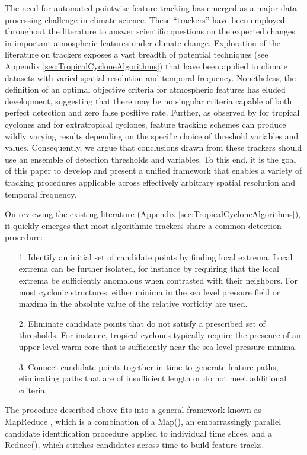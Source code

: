 \documentclass[gmdd, hvmath, online]{copernicus_discussions}
\begin{document}
The need for automated pointwise feature tracking has emerged as a major data processing challenge in climate science.  These ``trackers'' have been employed throughout the literature to answer scientific questions on the expected changes in important atmospheric features under climate change.  Exploration of the literature on trackers exposes a vast breadth of potential techniques (see Appendix \ref{sec:TropicalCycloneAlgorithms}) that have been applied to climate datasets with varied spatial resolution and temporal frequency.  Nonetheless, the definition of an optimal objective criteria for atmospheric features has eluded development, suggesting that there may be no singular criteria capable of both perfect detection and zero false positive rate.  Further, as observed by \cite{walsh2007objectively} for tropical cyclones and \cite{neu2013imilast} for extratropical cyclones, feature tracking schemes can produce wildly varying results depending on the specific choice of threshold variables and values.  Consequently, we argue that conclusions drawn from these trackers should use an ensemble of detection thresholds and variables.  To this end, it is the goal of this paper to develop and present a unified framework that enables a variety of tracking procedures applicable across effectively arbitrary spatial resolution and temporal frequency.

On reviewing the existing literature (Appendix \ref{sec:TropicalCycloneAlgorithms}), it quickly emerges that most algorithmic trackers share a common detection procedure:
\begin{itemize}
\item[1.] Identify an initial set of candidate points by finding local extrema.  Local extrema can be further isolated, for instance by requiring that the local extrema be sufficiently anomalous when contrasted with their neighbors.  For most cyclonic structures, either minima in the sea level pressure field or maxima in the absolute value of the relative vorticity are used.
\item[2.] Eliminate candidate points that do not satisfy a prescribed set of thresholds.  For instance, tropical cyclones typically require the presence of an upper-level warm core that is sufficiently near the sea level pressure minima.
\item[3.] Connect candidate points together in time to generate feature paths, eliminating paths that are of insufficient length or do not meet additional criteria.
\end{itemize}  The procedure described above fits into a general framework known as MapReduce \citep{dean2008mapreduce}, which is a combination of a Map(), an embarrassingly parallel candidate identification procedure applied to individual time slices, and a Reduce(), which stitches candidates across time to build feature tracks.
\end{document}
